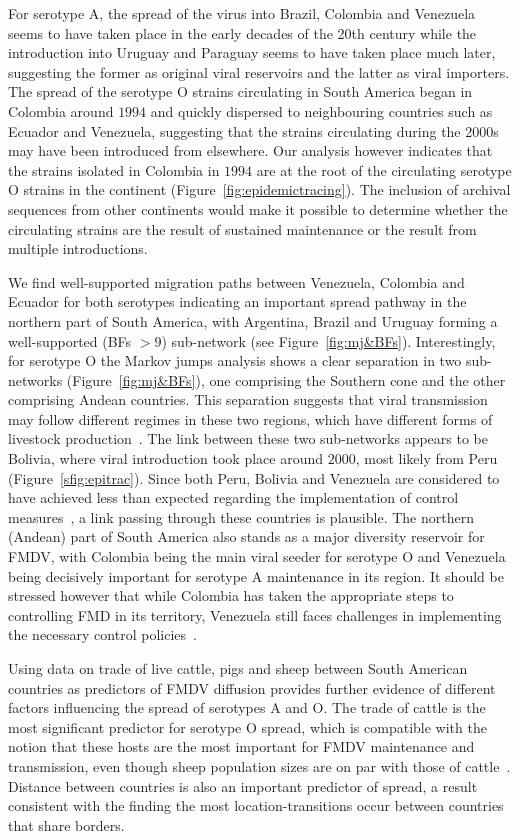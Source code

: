 \documentclass[10pt]{article}
\begin{document}
For serotype A, the spread of the virus into Brazil, Colombia and Venezuela seems to have taken place in the early decades of the 20th century while the introduction into Uruguay and Paraguay seems to have taken place much later, suggesting the former as original viral reservoirs and the latter as viral importers.
The spread of the serotype O strains circulating in South America began in Colombia around $1994$ and quickly dispersed to neighbouring countries such as Ecuador and Venezuela, suggesting that the strains circulating during the 2000s may have been introduced from elsewhere.
Our analysis however indicates that the strains isolated in Colombia in $1994$ are at the root of the circulating serotype O strains in the continent (Figure~\ref{fig:epidemictracing}).
The inclusion of archival sequences from other continents would make it possible to determine whether the circulating strains are the result of sustained maintenance or the result from multiple introductions. 

We find well-supported migration paths between Venezuela, Colombia and Ecuador for both serotypes indicating an important spread pathway in the northern part of South America, with Argentina, Brazil and Uruguay forming a well-supported (BFs $> 9$) sub-network (see Figure~\ref{fig:mj&BFs}).
Interestingly, for serotype O the Markov jumps analysis shows a clear separation in two sub-networks (Figure~\ref{fig:mj&BFs}), one comprising the Southern cone and the other comprising Andean countries.
This separation suggests that viral transmission may follow different regimes in these two regions, which have different forms of livestock production~\cite{Saraiva2003,Naranjo2013}.
The link between these two sub-networks appears to be Bolivia, where viral introduction took place around $2000$, most likely from Peru (Figure~\ref{sfig:epitrac}). 
Since both Peru, Bolivia and Venezuela are considered to have achieved less than expected regarding the implementation of control measures~\cite{Naranjo2013}, a link passing through these countries is plausible.
The northern (Andean) part of South America also stands as a major diversity reservoir for FMDV, with Colombia being the main viral seeder for serotype O and Venezuela being decisively important for serotype A maintenance in its region.
It should be stressed however that while Colombia has taken the appropriate steps to controlling FMD in its territory, Venezuela still faces challenges in implementing the necessary control policies~\cite{Naranjo2013}.

Using data on trade of live cattle, pigs and sheep between South American countries as predictors of FMDV diffusion provides further evidence of different factors influencing the spread of serotypes A and O.
The trade of cattle is the most significant predictor for serotype O spread, which is compatible with the notion that these hosts are the most important for FMDV maintenance and transmission, even though sheep population sizes are on par with those of cattle~\cite{Saraiva2003}.
Distance between countries is also an important predictor of spread, a result consistent with the finding the most location-transitions occur between countries that share borders.
\end{document}
